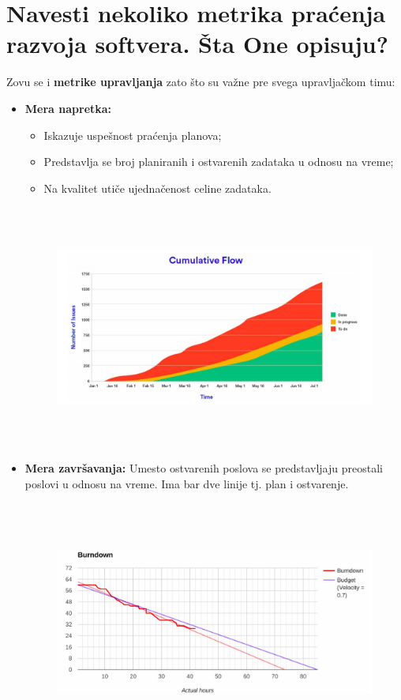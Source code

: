 \documentclass[a4paper]{article}
\begin{document}
\section{Navesti nekoliko metrika praćenja razvoja softvera. Šta One opisuju?}
  Zovu se i \textbf{metrike upravljanja} zato što su važne pre svega upravljačkom timu:
  \begin{itemize}
    \item \textbf{Mera napretka:}
      \begin{itemize}
        \item Iskazuje uspešnost praćenja planova;
        \item Predstavlja se broj planiranih i ostvarenih zadataka u odnosu na vreme;
        \item Na kvalitet utiče ujednačenost celine zadataka.
      \end{itemize}
    \begin{figure}[H]
      \begin{center}
          \includegraphics[width=120mm,height=80mm]{Slike/mera_napretka.png}
      \end{center}
    \end{figure}
    \item \textbf{Mera završavanja:} Umesto ostvarenih poslova se predstavljaju preostali poslovi
          u odnosu na vreme. Ima bar dve linije tj. plan i ostvarenje.
    \begin{figure}[H]
      \begin{center}
          \includegraphics[width=120mm,height=80mm]{Slike/mera_dovrsavanja.png}

\end{center}
\end{figure}
\end{itemize}
\end{document}
